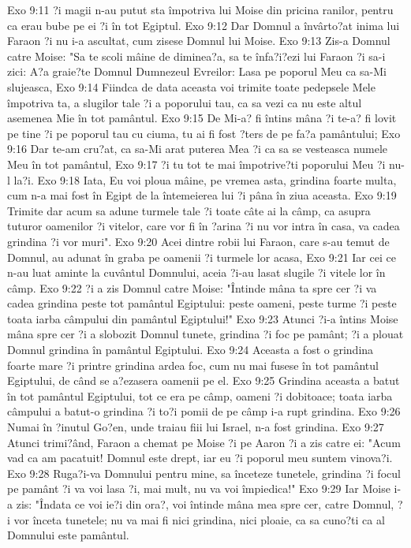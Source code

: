 Exo 9:11  ?i magii n-au putut sta împotriva lui Moise din pricina ranilor, pentru ca erau bube pe ei ?i în tot Egiptul.
Exo 9:12  Dar Domnul a învârto?at inima lui Faraon ?i nu i-a ascultat, cum zisese Domnul lui Moise.
Exo 9:13  Zis-a Domnul catre Moise: "Sa te scoli mâine de diminea?a, sa te înfa?i?ezi lui Faraon ?i sa-i zici: A?a graie?te Domnul Dumnezeul Evreilor: Lasa pe poporul Meu ca sa-Mi slujeasca,
Exo 9:14  Fiindca de data aceasta voi trimite toate pedepsele Mele împotriva ta, a slugilor tale ?i a poporului tau, ca sa vezi ca nu este altul asemenea Mie în tot pamântul.
Exo 9:15  De Mi-a? fi întins mâna ?i te-a? fi lovit pe tine ?i pe poporul tau cu ciuma, tu ai fi fost ?ters de pe fa?a pamântului;
Exo 9:16  Dar te-am cru?at, ca sa-Mi arat puterea Mea ?i ca sa se vesteasca numele Meu în tot pamântul,
Exo 9:17  ?i tu tot te mai împotrive?ti poporului Meu ?i nu-l la?i.
Exo 9:18  Iata, Eu voi ploua mâine, pe vremea asta, grindina foarte multa, cum n-a mai fost în Egipt de la întemeierea lui ?i pâna în ziua aceasta.
Exo 9:19  Trimite dar acum sa adune turmele tale ?i toate câte ai la câmp, ca asupra tuturor oamenilor ?i vitelor, care vor fi în ?arina ?i nu vor intra în casa, va cadea grindina ?i vor muri".
Exo 9:20  Acei dintre robii lui Faraon, care s-au temut de Domnul, au adunat în graba pe oamenii ?i turmele lor acasa,
Exo 9:21  Iar cei ce n-au luat aminte la cuvântul Domnului, aceia ?i-au lasat slugile ?i vitele lor în câmp.
Exo 9:22  ?i a zis Domnul catre Moise: "Întinde mâna ta spre cer ?i va cadea grindina peste tot pamântul Egiptului: peste oameni, peste turme ?i peste toata iarba câmpului din pamântul Egiptului!"
Exo 9:23  Atunci ?i-a întins Moise mâna spre cer ?i a slobozit Domnul tunete, grindina ?i foc pe pamânt; ?i a plouat Domnul grindina în pamântul Egiptului.
Exo 9:24  Aceasta a fost o grindina foarte mare ?i printre grindina ardea foc, cum nu mai fusese în tot pamântul Egiptului, de când se a?ezasera oamenii pe el.
Exo 9:25  Grindina aceasta a batut în tot pamântul Egiptului, tot ce era pe câmp, oameni ?i dobitoace; toata iarba câmpului a batut-o grindina ?i to?i pomii de pe câmp i-a rupt grindina.
Exo 9:26  Numai în ?inutul Go?en, unde traiau fiii lui Israel, n-a fost grindina.
Exo 9:27  Atunci trimi?ând, Faraon a chemat pe Moise ?i pe Aaron ?i a zis catre ei: "Acum vad ca am pacatuit! Domnul este drept, iar eu ?i poporul meu suntem vinova?i.
Exo 9:28  Ruga?i-va Domnului pentru mine, sa înceteze tunetele, grindina ?i focul pe pamânt ?i va voi lasa ?i, mai mult, nu va voi împiedica!"
Exo 9:29  Iar Moise i-a zis: "Îndata ce voi ie?i din ora?, voi întinde mâna mea spre cer, catre Domnul, ?i vor înceta tunetele; nu va mai fi nici grindina, nici ploaie, ca sa cuno?ti ca al Domnului este pamântul.

